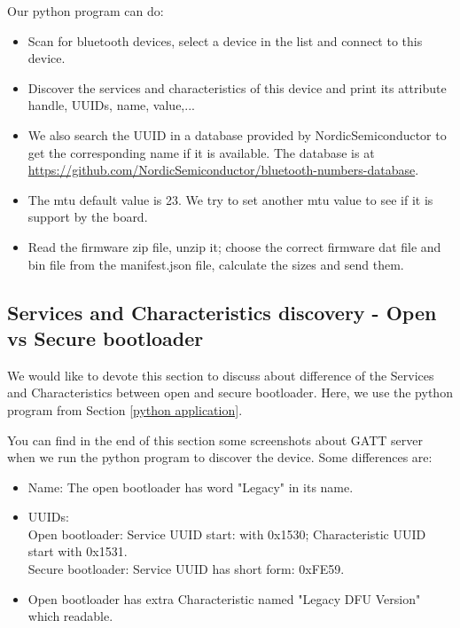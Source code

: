 \documentclass{article}
\theoremstyle{plain}
\theoremstyle{definition}
\numberwithin{equation}{section}
\begin{document}
Our python program can do:
\begin{itemize}
	\item Scan for bluetooth devices, select a device in the list and connect to this device.
	\item Discover the services and characteristics of this device and print its attribute handle, UUIDs, name, value,...
	\item We also search the UUID in a database provided by NordicSemiconductor to get the corresponding name if it is available. The database is at \url{https://github.com/NordicSemiconductor/bluetooth-numbers-database}.
	\item The mtu default value is 23. We try to set another mtu value to see if it is support by the board.
	\item Read the firmware zip file, unzip it; choose the correct firmware dat file and bin file from the manifest.json file, calculate the sizes and send them.
\end{itemize}

\subsection{Services and Characteristics discovery - Open vs Secure bootloader}\label{discover}
We would like to devote this section to discuss about difference of the Services and Characteristics between open and secure bootloader. Here, we use the python program from Section \ref{python application}.


You can find in the end of this section some screenshots about GATT server when we run the python program to discover the device. Some differences are:
\begin{itemize}
	\item Name: The open bootloader has word "Legacy" in its name.
	\item UUIDs:\\
	Open bootloader: Service UUID start: with 0x1530; Characteristic UUID start with 0x1531.\\
	Secure bootloader: Service UUID has short form: 0xFE59.
	\item Open bootloader has extra Characteristic named "Legacy DFU Version" which readable.
\end{itemize}
\end{document}
